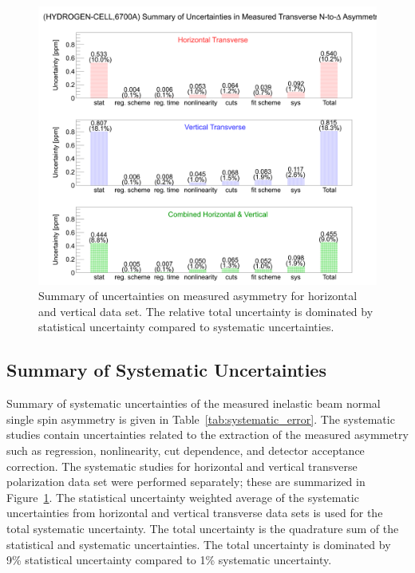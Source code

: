 \begin{figure}[!h]
	\begin{center}
	\includegraphics[width=15.0cm]{figures/errorChart}
	\end{center}
	\caption
	{Summary of uncertainties on measured asymmetry for horizontal and vertical data set. The relative total uncertainty is dominated by statistical uncertainty compared to systematic uncertainties.}
	\label{fig:errorChart}
\end{figure}

\subsection{Summary of Systematic Uncertainties}
\label{Summary of Systematic Uncertainties}
Summary of systematic uncertainties of the measured inelastic beam normal single spin asymmetry is given in Table~\ref{tab:systematic_error}. The systematic studies contain uncertainties related to the extraction of the measured asymmetry such as regression, nonlinearity, cut dependence, and detector acceptance correction. The systematic studies for horizontal and vertical transverse polarization data set were performed separately; these are summarized in Figure~\ref{fig:errorChart}. The statistical uncertainty weighted average of the systematic uncertainties from horizontal and vertical transverse data sets is used for the total systematic uncertainty. The total uncertainty is the quadrature sum of the statistical and systematic uncertainties. The total uncertainty is dominated by 9\% statistical uncertainty compared to 1\% systematic uncertainty.


